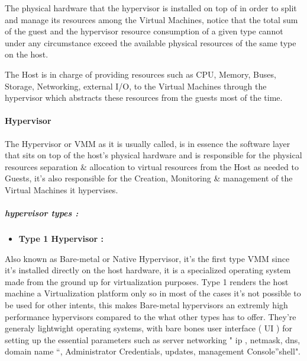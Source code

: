 \documentclass[
  14pt,
  english,
  a4paper,
]{scrreprt}
\providecommand{\tightlist}{%
  \setlength{\itemsep}{0pt}\setlength{\parskip}{0pt}}
\begin{document}
The physical hardware that the hypervisor is installed on top of in
order to split and manage its resources among the Virtual Machines,
notice that the total sum of the guest and the hypervisor resource
consumption of a given type cannot under any circumstance exceed the
available physical resources of the same type on the host.

The Host is in charge of providing resources such as CPU, Memory, Buses,
Storage, Networking, external I/O, to the Virtual Machines through the
hypervisor which abstracts these resources from the guests most of the
time.

\hypertarget{hypervisor}{%
\paragraph{Hypervisor}\label{hypervisor}}

The Hypervisor or VMM as it is usually called, is in essence the
software layer that sits on top of the host's physical hardware and is
responsible for the physical resources separation \& allocation to
virtual resources from the Host as needed to Guests, it's also
responsible for the Creation, Monitoring \& management of the Virtual
Machines it hypervises.

\hypertarget{hypervisor-types}{%
\subparagraph*{hypervisor types :}\label{hypervisor-types}}

\begin{itemize}
\tightlist
\item
  \textbf{Type 1 Hypervisor :}
\end{itemize}

Also known as Bare-metal or Native Hypervisor, it's the first type VMM
since it's installed directly on the host hardware, it is a specialized
operating system made from the ground up for virtualization purposes.
Type 1 renders the host machine a Virtualization platform only so in
most of the cases it's not possible to be used for other intents, this
makes Bare-metal hypervisors an extremly high performance hypervisors
compared to the what other types has to offer. They're generaly
lightwight operating systems, with bare bones user interface ( UI ) for
setting up the essential parameters such as server networking " ip ,
netmask, dns, domain name ``, Administrator Credentials, updates,
management Console''shell".
\end{document}
